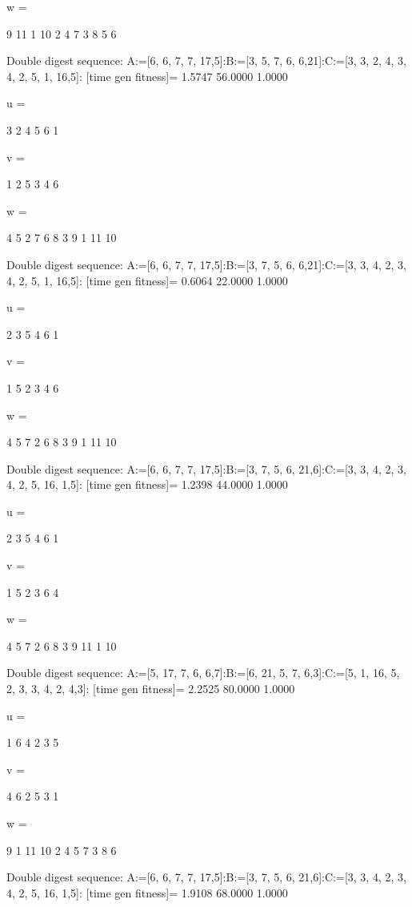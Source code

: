 w =

     9    11     1    10     2     4     7     3     8     5     6

Double digest sequence:
A:=[6, 6, 7, 7, 17,5]:B:=[3, 5, 7, 6, 6,21]:C:=[3, 3, 2, 4, 3, 4, 2, 5, 1, 16,5]:
[time gen fitness]=
    1.5747   56.0000    1.0000


u =

     3     2     4     5     6     1


v =

     1     2     5     3     4     6


w =

     4     5     2     7     6     8     3     9     1    11    10

Double digest sequence:
A:=[6, 6, 7, 7, 17,5]:B:=[3, 7, 5, 6, 6,21]:C:=[3, 3, 4, 2, 3, 4, 2, 5, 1, 16,5]:
[time gen fitness]=
    0.6064   22.0000    1.0000


u =

     2     3     5     4     6     1


v =

     1     5     2     3     4     6


w =

     4     5     7     2     6     8     3     9     1    11    10

Double digest sequence:
A:=[6, 6, 7, 7, 17,5]:B:=[3, 7, 5, 6, 21,6]:C:=[3, 3, 4, 2, 3, 4, 2, 5, 16, 1,5]:
[time gen fitness]=
    1.2398   44.0000    1.0000


u =

     2     3     5     4     6     1


v =

     1     5     2     3     6     4


w =

     4     5     7     2     6     8     3     9    11     1    10

Double digest sequence:
A:=[5, 17, 7, 6, 6,7]:B:=[6, 21, 5, 7, 6,3]:C:=[5, 1, 16, 5, 2, 3, 3, 4, 2, 4,3]:
[time gen fitness]=
    2.2525   80.0000    1.0000


u =

     1     6     4     2     3     5


v =

     4     6     2     5     3     1


w =

     9     1    11    10     2     4     5     7     3     8     6

Double digest sequence:
A:=[6, 6, 7, 7, 17,5]:B:=[3, 7, 5, 6, 21,6]:C:=[3, 3, 4, 2, 3, 4, 2, 5, 16, 1,5]:
[time gen fitness]=
    1.9108   68.0000    1.0000


